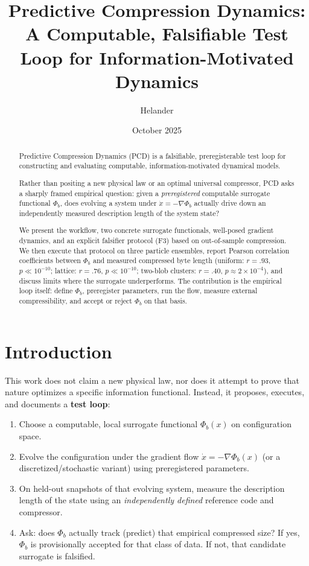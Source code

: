 \documentclass[11pt]{article}
\title{\textbf{Predictive Compression Dynamics:\\
A Computable, Falsifiable Test Loop for Information-Motivated Dynamics}}
\author[1]{Helander}
\affil[1]{Independent Researcher}
\date{October 2025}
\begin{document}
\maketitle

\begin{abstract}
Predictive Compression Dynamics (PCD) is a falsifiable, preregisterable test loop for constructing and evaluating computable, information-motivated dynamical models.

Rather than positing a new physical law or an optimal universal compressor, PCD asks a sharply framed empirical question:
given a \emph{preregistered} computable surrogate functional $\Phi_b$, does evolving a system under $\dot{x}=-\nabla\Phi_b$ actually drive down an independently measured description length of the system state?

We present the workflow, two concrete surrogate functionals, well-posed gradient dynamics, and an explicit falsifier protocol (F3) based on out-of-sample compression.
We then execute that protocol on three particle ensembles, report Pearson correlation coefficients between $\Phi_b$ and measured compressed byte length (uniform: $r{=}.93$, $p{\ll}10^{-10}$; lattice: $r{=}.76$, $p{\ll}10^{-10}$; two-blob clusters: $r{=}.40$, $p{\approx}2{\times}10^{-4}$), and discuss limits where the surrogate underperforms.
The contribution is the empirical loop itself: define $\Phi_b$, preregister parameters, run the flow, measure external compressibility, and accept or reject $\Phi_b$ on that basis.
\end{abstract}

\section{Introduction}
This work does not claim a new physical law, nor does it attempt to prove that nature optimizes a specific information functional.
Instead, it proposes, executes, and documents a \textbf{test loop}:

\begin{enumerate}
    \item Choose a computable, local surrogate functional $\Phi_b(x)$ on configuration space.
    \item Evolve the configuration under the gradient flow $\dot{x} = -\nabla \Phi_b(x)$ (or a discretized/stochastic variant) using preregistered parameters.
    \item On held-out snapshots of that evolving system, measure the description length of the state using an \emph{independently defined} reference code and compressor.
    \item Ask: does $\Phi_b$ actually track (predict) that empirical compressed size?  If yes, $\Phi_b$ is provisionally accepted for that class of data. If not, that candidate surrogate is falsified.
\end{enumerate}
\end{document}
